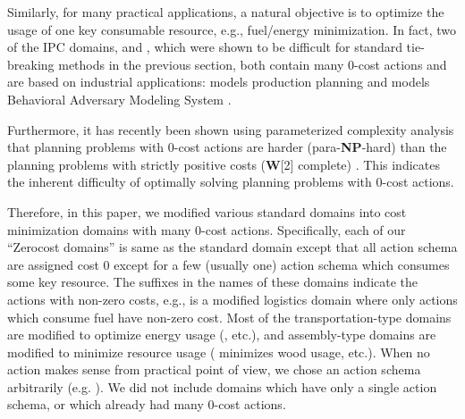 Similarly, for many practical applications, a natural objective is to
optimize the usage of one key consumable resource, e.g., fuel/energy
minimization.  In fact, two of the IPC domains,  and
, which were shown to be difficult for standard tie-breaking
methods in the previous section, both contain many 0-cost actions
and are based on industrial applications: %
 models
production planning \cite{fink1999applications} and 
models Behavioral Adversary Modeling System \cite[minimizing decryption,
data transfer, etc.]{boddy2005course}.

Furthermore, it has recently been shown using parameterized complexity analysis that  planning problems with
0-cost actions are harder (para-\textbf{NP}-hard) than the planning problems with strictly positive
costs (\textbf{W}[2] complete) \cite{aghighi2015}. This indicates the inherent difficulty of optimally solving
planning problems with 0-cost actions.

Therefore, in this paper, we modified various standard domains
into cost minimization domains with many 0-cost actions.
Specifically, each of our ``Zerocost domains'' is same as the standard domain except that all action schema are assigned
cost 0 except for a few (usually one) action schema which consumes some key resource.
The suffixes in the names of these domains indicate the actions with non-zero costs, 
e.g.,  is a modified logistics domain where only actions which consume fuel have non-zero cost.
Most of the transportation-type domains are modified to optimize 
energy usage (,  etc.), and  assembly-type domains are modified to minimize resource usage
( minimizes wood usage, etc.).
When no action makes sense from practical point of view, we chose an action schema arbitrarily (e.g. ).
We did not
include domains which have only a single action schema, or which already had many 0-cost actions.

